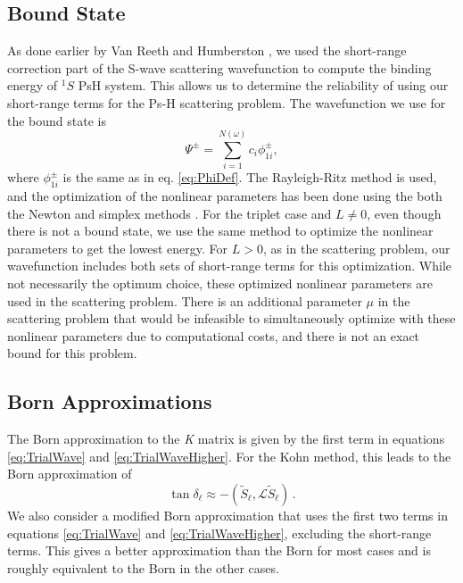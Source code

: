 \documentclass[preprint,showpacs,preprintnumbers,amsmath,amssymb]{revtex4}
\begin{document}


\subsection{Bound State}
As done earlier by Van Reeth and Humberston \cite{VanReeth2003,VanReeth2004}, we used the short-range correction part of the S-wave scattering wavefunction to compute the binding energy of $^1S$ PsH system. This allows us to determine the reliability of using our short-range terms for the Ps-H scattering problem. The wavefunction we use for the bound state is
\begin{equation}
\label{eq:BoundWavefn}
\Psi^\pm = \sum_{i=1}^{N(\omega)} c_i \phi_{1i}^\pm,
\end{equation}
where $\phi_{1i}^\pm$ is the same as in eq. \ref{eq:PhiDef}. The Rayleigh-Ritz method is used, and the optimization of the nonlinear parameters has been done using the both the Newton and simplex methods \cite{Yan1999,GSL}. For the triplet case and $L \neq 0$, even though there is not a bound state, we use the same method to optimize the nonlinear parameters to get the lowest energy. For $L > 0$, as in the scattering problem, our wavefunction includes both sets of short-range terms for this optimization. While not necessarily the optimum choice, these optimized nonlinear parameters are used in the scattering problem. There is an additional parameter $\mu$ in the scattering problem that would be infeasible to simultaneously optimize with these nonlinear parameters due to computational costs, and there is not an exact bound for this problem.


\subsection{Born Approximations}
The Born approximation to the \emph{K} matrix \citep[pg. 620]{Bransden2003} is given by the first term in equations \ref{eq:TrialWave} and \ref{eq:TrialWaveHigher}. For the Kohn method, this leads to the Born approximation of
\begin{equation}
\label{eq:Born}
\tan\delta_\ell \approx -(\widetilde{S}_\ell,\mathcal{L}\widetilde{S}_\ell )\, .
\end{equation}
We also consider a modified Born approximation that uses the first two terms in equations \ref{eq:TrialWave} and \ref{eq:TrialWaveHigher}, excluding the short-range terms. This gives a better approximation than the Born for most cases and is roughly equivalent to the Born in the other cases.
\end{document}

